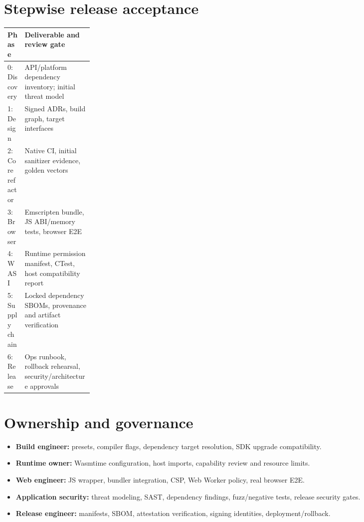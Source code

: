 \documentclass[11pt,letterpaper]{article}
\begin{document}
\section{Stepwise release acceptance}
\noindent\begin{tabularx}{\linewidth}{p{0.20\linewidth}X}
\toprule Phase & Deliverable and review gate \\ \midrule
0: Discovery & API/platform dependency inventory; initial threat model \\
1: Design & Signed ADRs, build graph, target interfaces \\
2: Core refactor & Native CI, initial sanitizer evidence, golden vectors \\
3: Browser & Emscripten bundle, JS ABI/memory tests, browser E2E \\
4: WASI & Runtime permission manifest, CTest, host compatibility report \\
5: Supply chain & Locked dependency SBOMs, provenance and artifact verification \\
6: Release & Ops runbook, rollback rehearsal, security/architecture approvals \\
\bottomrule
\end{tabularx}

\section{Ownership and governance}
\begin{itemize}
\item \textbf{Build engineer:} presets, compiler flags, dependency target resolution, SDK upgrade compatibility.
\item \textbf{Runtime owner:} Wasmtime configuration, host imports, capability review and resource limits.
\item \textbf{Web engineer:} JS wrapper, bundler integration, CSP, Web Worker policy, real browser E2E.
\item \textbf{Application security:} threat modeling, SAST, dependency findings, fuzz/negative tests, release security gates.
\item \textbf{Release engineer:} manifests, SBOM, attestation verification, signing identities, deployment/rollback.
\end{itemize}
\end{document}

